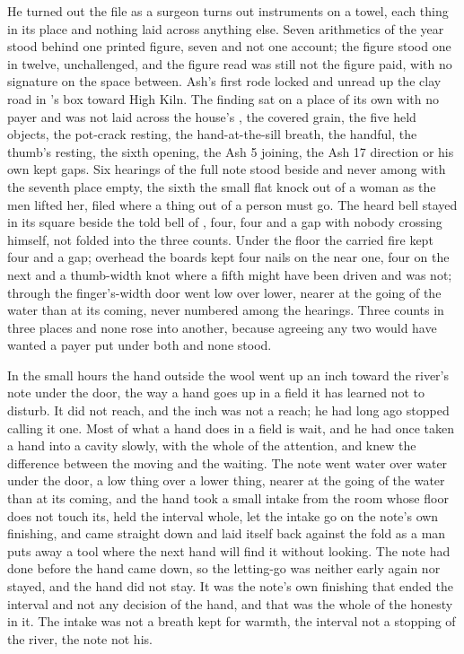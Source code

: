 He turned out the file as a surgeon turns out instruments on a towel, each thing in its place and nothing laid across anything else. Seven arithmetics of the year stood behind one printed figure, seven and not one account; the figure stood one in twelve, unchallenged, and the figure read was still not the figure paid, with no signature on the space between. Ash’s first rode locked and unread up the clay road in ’s box toward High Kiln. The finding sat on a place of its own with no payer and was not laid across the house’s , the covered grain, the five held objects, the pot-crack resting, the hand-at-the-sill breath, the handful, the thumb’s resting, the sixth opening, the Ash 5 joining, the Ash 17 direction or his own kept gaps. Six hearings of the full note stood beside and never among with the seventh place empty, the sixth the small flat knock out of a woman as the men lifted her, filed where a thing out of a person must go. The heard bell stayed in its square beside the told bell of , four, four and a gap with nobody crossing himself, not folded into the three counts. Under the floor the carried fire kept four and a gap; overhead the boards kept four nails on the near one, four on the next and a thumb-width knot where a fifth might have been driven and was not; through the finger’s-width door  went low over lower, nearer at the going of the water than at its coming, never numbered among the hearings. Three counts in three places and none rose into another, because agreeing any two would have wanted a payer put under both and none stood.

In the small hours the hand outside the wool went up an inch toward the river’s note under the door, the way a hand goes up in a field it has learned not to disturb. It did not reach, and the inch was not a reach; he had long ago stopped calling it one. Most of what a hand does in a field is wait, and he had once taken a hand into a cavity slowly, with the whole of the attention, and knew the difference between the moving and the waiting. The note went water over water under the door, a low thing over a lower thing, nearer at the going of the water than at its coming, and the hand took a small intake from the room whose floor does not touch its, held the interval whole, let the intake go on the note’s own finishing, and came straight down and laid itself back against the fold as a man puts away a tool where the next hand will find it without looking. The note had done before the hand came down, so the letting-go was neither early again nor stayed, and the hand did not stay. It was the note’s own finishing that ended the interval and not any decision of the hand, and that was the whole of the honesty in it. The intake was not a breath kept for warmth, the interval not a stopping of the river, the note not his.

